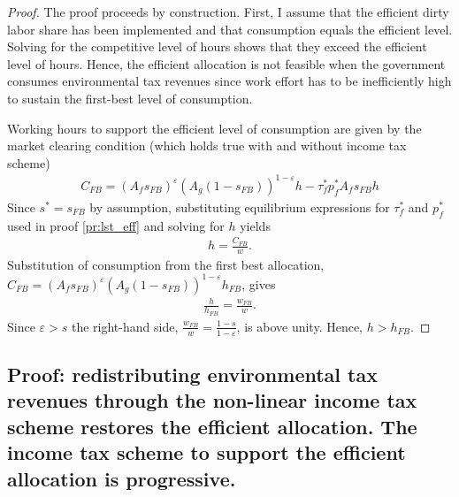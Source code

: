 \begin{proof}
	The proof proceeds by construction. First, I assume that the efficient dirty labor share has been implemented and that consumption equals the efficient level. Solving for the competitive level of hours shows that they exceed the efficient level of hours.  Hence, the efficient allocation is not feasible when the government consumes environmental tax revenues since work effort has to be inefficiently high to sustain the first-best level of consumption. 
	
	Working hours to support the efficient level of consumption are given by the market clearing condition  (which holds true with and without income tax scheme)
	\begin{align}
		C_{FB} = \left(A_f s_{FB}\right)^\varepsilon\left(A_g(1-s_{FB})\right)^{1-\varepsilon}h-\tau_f^*p_f^*A_fs_{FB}h
	\end{align}
Since $s^*=s_{FB}$ by assumption, substituting equilibrium expressions for $\tau_f^*$ and $p_f^*$ used in proof \ref{pr:lst_eff} and solving for $h$ yields
	\begin{align}
	h=\frac{C_{FB}}{w}.
	\end{align}
	Substitution of consumption from the first best allocation, $C_{FB}=\left(A_f s_{FB}\right)^\varepsilon\left(A_g(1-s_{FB})\right)^{1-\varepsilon}h_{FB}$, gives
	\begin{align}
\frac{h}{h_{FB}}=\frac{w_{FB}}{w}.
	\end{align}
	Since $\varepsilon>s$ the right-hand side, $\frac{w_{FB}}{w}=\frac{1-s}{1-\varepsilon}$, is above unity. Hence, $h>h_{FB}$. 
\end{proof}

\subsection{Proof: redistributing environmental tax revenues through the non-linear income tax scheme restores the efficient allocation. The income tax scheme to support the efficient allocation is progressive.}

